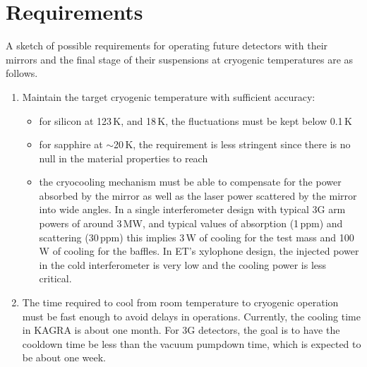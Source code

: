 \section{Requirements}
A sketch of possible requirements for operating future detectors with their mirrors and the final stage of their suspensions at cryogenic temperatures are as follows. 
\begin{enumerate}
\item Maintain the target cryogenic temperature with sufficient accuracy:
      \begin{itemize}
        \item for silicon at 123\,K, and 18\,K, the fluctuations must be kept below 0.1\,K
        \item for sapphire at $\sim$20\,K, the requirement is less stringent since there is no null in the material properties to reach
        \item the cryocooling mechanism must be able to compensate for the power absorbed by the mirror as well as the laser power scattered by the mirror into wide angles. In a single interferometer design with typical 3G arm powers of around 3\,MW, and typical values of absorption (1\,ppm) and scattering (30\,ppm) this implies 3\,W of cooling for the test mass and 100\,W of cooling for the baffles. In ET's xylophone design, the injected power in the cold interferometer is very low and the cooling power is less critical. 
      \end{itemize}

\item The time required to cool from room temperature to cryogenic operation must be fast enough to avoid delays in operations. Currently, the cooling time in KAGRA is about one month. For 3G detectors, the goal is to have the cooldown time be less than the vacuum pumpdown time, which is expected to be about one week.  



\end{enumerate}
